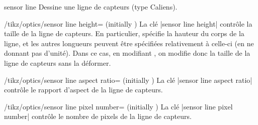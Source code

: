 \documentclass[a4paper]{ltxdoc}
\begin{document}
\begin{shape}{sensor line}
Dessine une ligne de capteurs (type Caliens).

\begin{codeexample}[width=6cm]
\end{codeexample}

\begin{key}{/tikz/optics/sensor line height= (initially )}
    La clé |sensor line height| contrôle la taille de la ligne de capteurs. En particulier,  spécifie la hauteur du corps de la ligne,
    et les autres longueurs peuvent être spécifiées relativement à celle-ci (en ne donnant pas d'unité). Dans ce cas, en modifiant , on modifie donc la taille de la ligne de capteurs
    sans la déformer.  

    \begin{codeexample}[]
    \end{codeexample}
\end{key}

\begin{key}{/tikz/optics/sensor line aspect ratio= (initially )}
    La clé |sensor line aspect ratio| contrôle le rapport d'aspect de la ligne de capteurs.

    \begin{codeexample}[]
    \end{codeexample}
\end{key}


\begin{key}{/tikz/optics/sensor line pixel number= (initially )}
    La clé |sensor line pixel number| contrôle le nombre de pixels  de la ligne de capteurs.


\end{key}
\end{shape}
\end{document}
